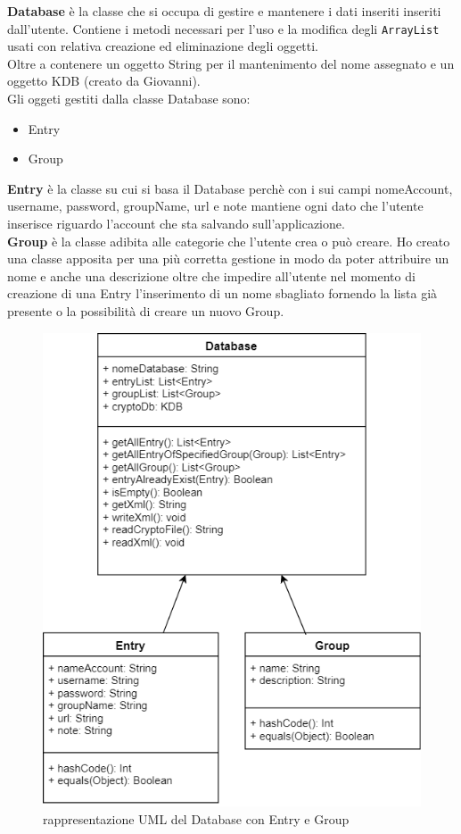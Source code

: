 \documentclass[a4paper,12pt]{report}
\begin{document}
\textbf{Database} è la classe che si occupa di gestire e mantenere i dati inseriti inseriti dall'utente. Contiene i metodi necessari per l'uso e la modifica degli \texttt{ArrayList} usati con relativa creazione ed eliminazione degli oggetti.\\
Oltre a contenere un oggetto String per il mantenimento del nome assegnato e un oggetto KDB (creato da Giovanni).\\

Gli oggeti gestiti dalla classe Database sono:
\begin{itemize}
  \item Entry
  \item Group
\end{itemize}

\textbf{Entry} è la classe su cui si basa il Database perchè con i sui campi nomeAccount, username, password, groupName, url e note mantiene ogni dato che l'utente inserisce riguardo l'account che sta salvando sull'applicazione.\\

\textbf{Group} è la classe adibita alle categorie che l'utente crea o può creare. Ho creato una classe apposita per una più corretta gestione in modo da poter attribuire un nome e anche una descrizione oltre che impedire all'utente nel momento di creazione di una Entry l'inserimento di un nome sbagliato fornendo la lista già presente o la possibilità di creare un nuovo Group. 

\begin{figure}[h]
\centering{}
\includegraphics[width=\textwidth]{DatabaseUml}
\caption{rappresentazione UML del Database con Entry e Group}
\end{figure}
\end{document}
